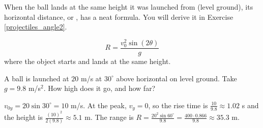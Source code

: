 \begin{center}
\end{center}
When the ball lands at the same height it was launched from (level
ground), its horizontal distance, or , has a neat formula.
You will derive it in Exercise \ref{projectiles_angle2}.
\begin{mdframed}[frametitle={Range Formula},style=important]
    \begin{equation}
        R = \frac{v_0^2 \sin(2\theta)}{g}
    \end{equation}
    where the object starts and lands at the same height.
\end{mdframed}

\begin{Worked}
\begin{Problem}
A ball is launched at $20$ m/s at $30^\circ$
above horizontal on level ground. Take $g = 9.8$ m/s$^2$. How high does it
go, and how far?
\end{Problem}
\begin{Solution}
$v_{0y} = 20 \sin 30^\circ = 10$ m/s. At the peak,
$v_y = 0$, so the rise time is $\frac{10}{9.8} \approx 1.02$ s and the
height is $\frac{(10)^2}{2(9.8)} \approx 5.1$ m. The range is
$R = \frac{20^2 \sin 60^\circ}{9.8} = \frac{400 \cdot 0.866}{9.8} \approx 35.3$ m.
\end{Solution}
\end{Worked}

